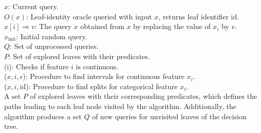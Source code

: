 
$x$: Current query. \\
$O(x)$: Leaf-identity oracle queried with input $x$, returns leaf identifier $\text{id}$. \\
$x[i] \Rightarrow v$: The query $x$ obtained from $x$ by replacing the value of $x_i$ by $v$. \\
$x_{\text{init}}$: Initial random query. \\
$Q$: Set of unprocessed queries. \\
$P$: Set of explored leaves with their predicates. \\
(i): Checks if feature $i$ is continuous. \\
($x, i, \epsilon$): Procedure to find intervals for continuous feature $x_i$. \\
($x, i, \text{id}$): Procedure to find splits for categorical feature $x_i$. \\

A set $P$ of explored leaves with their corresponding predicates, which defines the paths leading to each leaf node visited by the algorithm. Additionally, the algorithm produces a set $Q$ of new queries for unvisited leaves of the decision tree.


